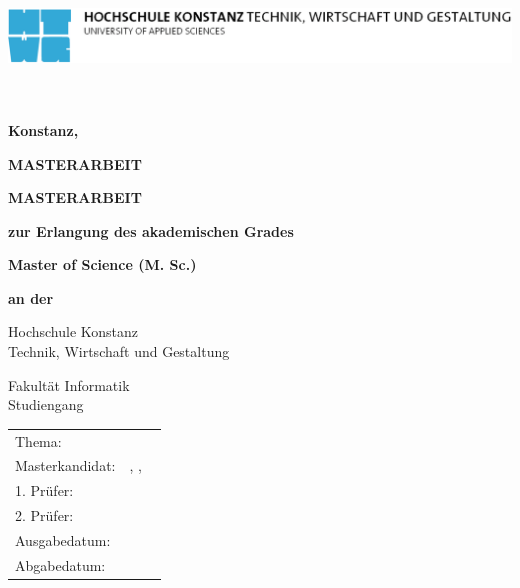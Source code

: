 
\begin{titlepage}
\vspace*{-3.5cm}
 \begin{flushleft}
 \hspace*{-1cm} \includegraphics[width=15.7cm]{images/htwg-logo}
 \end{flushleft}
\vspace{2.5cm}
\begin{center}
	\huge{
		\textbf{\thema} \\[5cm]
	} 
	\Large{
		\textbf{\autor}} \\[6.5cm]
	\large{
		\textbf{Konstanz, \abgabedatum} \\[2.3cm]
	}
	
	\Huge{
		\textbf{{\sf MASTERARBEIT}}
	}
\end{center}
\end{titlepage}

\begin{center}
\setlength{\parskip}{0.5cm}
\textbf{\huge MASTERARBEIT}

\textbf{zur Erlangung des akademischen Grades}

\textbf{\Large Master of Science (M. Sc.)}

\textbf{an der}

\textsf{\huge Hochschule Konstanz}\\
{\small Technik, Wirtschaft und Gestaltung}

\textsf{\Large Fakultät Informatik} \\
{Studiengang \studiengang}

\vfill

\begin{tabular}{p{3cm}p{10cm}}
	Thema: 			& \textbf{\large \thema} \\[15ex]
	Masterkandidat: & \autor, \autorStrasse, \autorPLZ\ \autorOrt \\[15ex]
	1. Prüfer: 		& \prueferA \\
	2. Prüfer: 		& \prueferB \\[25ex]
	Ausgabedatum: 	& \ausgabedatum \\
	Abgabedatum: 	& \abgabedatum \\
\end{tabular}

\end{center}

